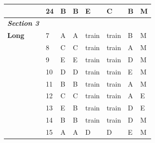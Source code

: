 \documentclass[pageno]{jpaper}
\newcommand{\textbi}[1]{\textbf{\textit{#1}}}
\begin{document}
\begin{table}[]
\begin{tabular}{llllllll}
\textbf{}                & 24              & B                       & B                      & E                       & C                       & B                       & M                   \\ \midrule
\textbi{Section 3}       &                 &                         &                        &                         &                         &                         &                     \\ \midrule
\textbf{Long}            & 7               & A                       & A                      & train                   & train                   & B                       & M                   \\
\textbf{}                & 8               & C                       & C                      & train                   & train                   & A                       & M                   \\
\textbf{}                & 9               & E                       & E                      & train                   & train                   & D                       & M                   \\
\textbf{}                & 10              & D                       & D                      & train                   & train                   & E                       & M                   \\
\textbf{}                & 11              & B                       & B                      & train                   & train                   & A                       & M                   \\
\textbf{}                & 12              & C                       & C                      & train                   & train                   & A                       & E                   \\
\textbf{}                & 13              & E                       & B                      & train                   & train                   & D                       & E                   \\
\textbf{}                & 14              & B                       & B                      & train                   & train                   & D                       & M                   \\
\textbf{}                & 15              & A                       & A                      & D                       & D                       & E                       & M                   \\

\end{tabular}
\end{table}
\end{document}
